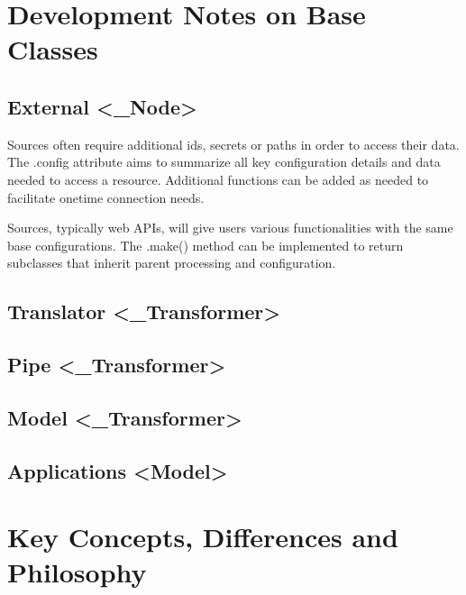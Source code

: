 \documentclass[letterpaper,10pt,english]{sphinxmanual}
\begin{document}
\section{Development Notes on Base Classes}
\label{\detokenize{developers-guide:development-notes-on-base-classes}}

\subsection{External \textless{}\_Node\textgreater{}}
\label{\detokenize{developers-guide:external-node}}
 Sources often require additional ids, secrets or paths in order to access their data. The .config attribute aims to summarize all key configuration details and data needed to access a resource. Additional functions can be added as needed to facilitate one\sphinxhyphen{}time connection needs.

 Sources, typically web APIs, will give users various functionalities with the same base configurations. The .make() method can be implemented to return subclasses that inherit parent processing and configuration.


\subsection{Translator \textless{}\_Transformer\textgreater{}}
\label{\detokenize{developers-guide:translator-transformer}}

\subsection{Pipe \textless{}\_Transformer\textgreater{}}
\label{\detokenize{developers-guide:pipe-transformer}}

\subsection{Model \textless{}\_Transformer\textgreater{}}
\label{\detokenize{developers-guide:model-transformer}}

\subsection{Applications \textless{}Model\textgreater{}}
\label{\detokenize{developers-guide:applications-model}}

\section{Key Concepts, Differences and Philosophy}
\label{\detokenize{developers-guide:key-concepts-differences-and-philosophy}}
\end{document}

